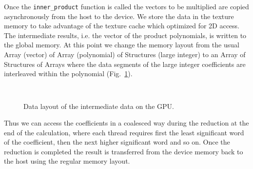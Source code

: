 \documentclass[oribibl,a4paper]{llncs2e/llncs}
\begin{document}
Once the \verb|inner_product| function is called the vectors to be multiplied are copied asynchronously from the host to the device.
We store the data in the texture memory to take advantage of the texture cache which optimized for 2D access.
The intermediate results, i.e. the vector of the product polynomials, is written to the global memory.
At this point we change the memory layout from the usual Array (vector) of Array (polynomial) of Structures (large integer) to an Array of Structures of Arrays where the data segments of the large integer coefficients are interleaved within the polynomial (Fig.\ \ref{fig:GPU_data_layout}).
\begin{figure}[t]
    \centering
    \mbox{
    }
    \caption{Data layout of the intermediate data on the GPU.}
    \label{fig:GPU_data_layout}
\end{figure}
Thus we can access the coefficients in a coalesced way during the reduction at the end of the calculation, where each thread requires first the least significant word of the coefficient, then the next higher significant word and so on.
Once the reduction is completed the result is transferred from the device memory back to the host using the regular memory layout.
\end{document}
